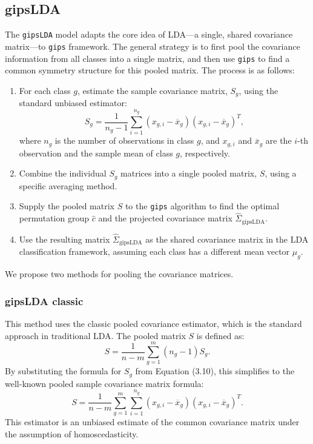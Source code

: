 \documentclass[a4paper,11pt,twoside]{report}
\theoremstyle{definition}
\begin{document}
\subsection{gipsLDA}
The \texttt{gipsLDA} model adapts the core idea of LDA—a single, shared covariance matrix—to \texttt{gips} framework. The general strategy is to first pool the covariance information from all classes into a single matrix, and then use \texttt{gips} to find a common symmetry structure for this pooled matrix. The process is as follows:
\begin{enumerate}
    \item For each class $g$, estimate the sample covariance matrix, $S_g$, using the standard unbiased estimator:
    \begin{equation}
        S_g = \frac{1}{n_g-1} \sum^{n_g}_{i=1} (x_{g,i} -\overline{x}_g)(x_{g,i} -\overline{x}_g)^T,
    \end{equation}
    where $n_g$ is the number of observations in class $g$, and $x_{g,i}$ and $\overline{x}_g$ are the $i$-th observation and the sample mean of class $g$, respectively.
    \item Combine the individual $S_g$ matrices into a single pooled matrix, $S$, using a specific averaging method.
    \item Supply the pooled matrix $S$ to the \texttt{gips} algorithm to find the optimal permutation group $\hat{c}$ and the projected covariance matrix $\hat{\Sigma}_{\text{gipsLDA}}$.
    \item Use the resulting matrix $\hat{\Sigma}_{\text{gipsLDA}}$ as the shared covariance matrix in the LDA classification framework, assuming each class has a different mean vector $\mu_g$.
\end{enumerate}
We propose two methods for pooling the covariance matrices.

\subsubsection{gipsLDA classic}
This method uses the classic pooled covariance estimator, which is the standard approach in traditional LDA. The pooled matrix $S$ is defined as:
\begin{equation}
    S = \frac{1}{n-m}\sum_{g=1}^m (n_g-1)S_{g}.
\end{equation}
By substituting the formula for $S_g$ from Equation (3.10), this simplifies to the well-known pooled sample covariance matrix formula:
\begin{equation}
S = \frac{1}{n-m}\sum_{g=1}^m \sum^{n_g}_{i=1} (x_{g,i} -\overline{x}_g)(x_{g,i} -\overline{x}_g)^T.
\end{equation}
This estimator is an unbiased estimate of the common covariance matrix under the assumption of homoscedasticity.
\end{document}
